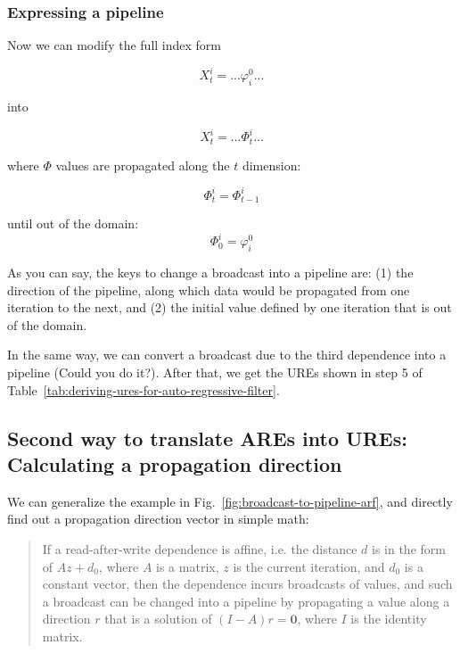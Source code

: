 \subsubsection{Expressing a pipeline} 
\label{sec:express-pipeline}

Now we can modify the full index form

\begin{equation}
X_t^i=...\varphi_i^0...
\end{equation}

into

\begin{equation}
X_t^i=...\Phi_t^i...
\end{equation}

where $\Phi$ values are propagated along the $t$ dimension:

\begin{equation}
\Phi_t^i=\Phi_{t-1}^i
\end{equation}

until out of the domain:
\begin{equation}
\Phi_0^i=\varphi_i^0
\end{equation}

As you can say, the keys to change a broadcast into a pipeline are: (1) the direction of the pipeline, along which data would be propagated from one iteration to the next, and (2) the initial value defined by one iteration that is  out of the domain.  

In the same way, we can convert a broadcast due to the third dependence into a pipeline (Could you do it?). After that, we get the UREs shown in step 5 of  Table~\ref{tab:deriving-ures-for-auto-regressive-filter}.

\subsection{Second way to translate AREs into UREs: Calculating a propagation direction}
\label{sec:are-to-ures-with-math}

We can generalize the example in Fig.~\ref{fig:broadcast-to-pipeline-arf}, and directly find out a propagation direction vector in simple math: 

\begin{quotation}
\noindent If a read-after-write dependence is affine, i.e. the distance $d$ is in the form of $Az+d_0$, where $A$ is a matrix, $z$ is the current iteration, and $d_0$ is a constant vector, then the dependence incurs broadcasts of values, and such a broadcast can be changed into a pipeline by propagating a value along a direction $r$ that is a solution of $(I-A)r=\mathbf{0}$, where $I$ is the identity matrix.
\end{quotation}

